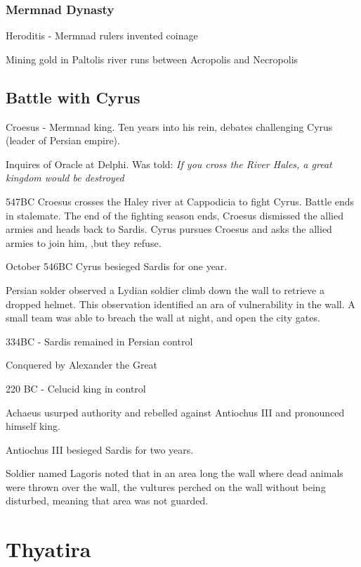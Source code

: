 \documentclass[
]{book}
\begin{document}
\hypertarget{mermnad-dynasty}{%
\subsection{Mermnad Dynasty}\label{mermnad-dynasty}}

Heroditis - Mermnad rulers invented coinage

Mining gold in Paltolis river runs between Acropolis and Necropolis

\hypertarget{battle-with-cyrus}{%
\section{Battle with Cyrus}\label{battle-with-cyrus}}

Croesus - Mermnad king. Ten years into his rein, debates challenging Cyrus (leader of Persian empire).

Inquires of Oracle at Delphi. Was told: \emph{If you cross the River Hales, a great kingdom would be destroyed}

547BC Croesus crosses the Haley river at Cappodicia to fight Cyrus. Battle ends in stalemate. The end of the fighting season ends, Croesus dismissed the allied armies and heads back to Sardis. Cyrus pursues Croesus and asks the allied armies to join him, ,but they refuse.

October 546BC Cyrus besieged Sardis for one year.

Persian solder observed a Lydian soldier climb down the wall to retrieve a dropped helmet. This observation identified an ara of vulnerability in the wall. A small team was able to breach the wall at night, and open the city gates.

334BC - Sardis remained in Persian control

Conquered by Alexander the Great

220 BC - Celucid king in control

Achaeus usurped authority and rebelled against Antiochus III and pronounced himself king.

Antiochus III besieged Sardis for two years.

Soldier named Lagoris noted that in an area long the wall where dead animals were thrown over the wall, the vultures perched on the wall without being disturbed, meaning that area was not guarded.

\hypertarget{thyatira}{%
\chapter{Thyatira}\label{thyatira}}
\end{document}
